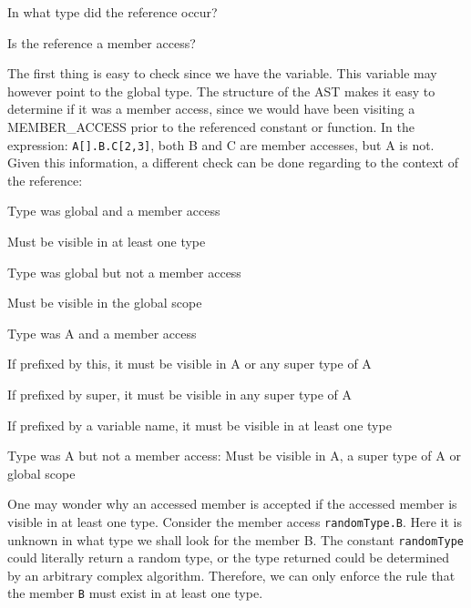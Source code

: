 \begin{nlist}
  \item In what type did the reference occur?
  \item Is the reference a member access?
\end{nlist}

The first thing is easy to check since we have the 
variable. This variable may however point to the global type. The structure of
the AST makes it easy to determine if it was a member access, since we would
have been visiting a MEMBER\_ACCESS  prior to the referenced
constant or function. In the expression: \texttt{A[].B.C[2,3]}, both B and C are
member accesses, but A is not. Given this information, a different check can be
done regarding to the context of the reference:

\begin{nlist}
  \item Type was global and a member access
  \begin{dlist}
    \item Must be visible in at least one type
  \end{dlist} 
  \item Type was global but not a member access
  \begin{dlist}
    \item Must be visible in the global scope
  \end{dlist}
  \item Type was A and a member access
  \begin{dlist}
    \item If prefixed by this, it must be visible in A or any super type of A
    \item If prefixed by super, it must be visible in any super type of A
    \item If prefixed by a variable name, it must be visible in at least one type
  \end{dlist}
  \item Type was A but not a member access: Must be visible in A, a super type
    of A or global scope
\end{nlist}

One may wonder why an accessed member is accepted if the accessed member is
visible in at least one type. Consider the member access \texttt{randomType.B}.
Here it is unknown in what type we shall look for the member B. The constant
\texttt{randomType} could literally return a random type, or the type returned
could be determined by an arbitrary complex algorithm. Therefore, we can only
enforce the rule that the member \texttt{B} must exist in at least one type.

